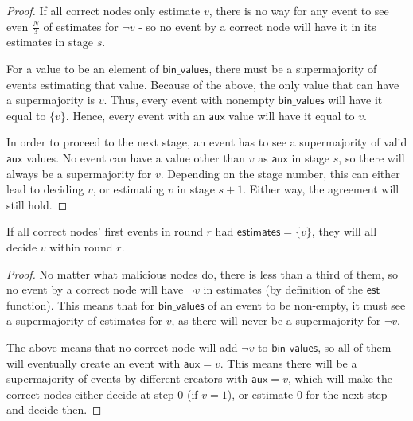 \documentclass[a4paper,fleqn]{article}
\begin{document}
\begin{proof}
	If all correct nodes only estimate $v$, there is no way for any event to see even $\frac{N}{3}$
	of estimates for $\neg v$ - so no event by a correct node will have it in its estimates in
	stage $s$.

	For a value to be an element of $\mathsf{bin\_values}$, there must be a supermajority of events
	estimating that value. Because of the above, the only value that can have a supermajority is
	$v$. Thus, every event with nonempty $\mathsf{bin\_values}$ will have it equal to $\{v\}$.
	Hence, every event with an $\mathsf{aux}$ value will have it equal to $v$.

	In order to proceed to the next stage, an event has to see a supermajority of valid
	$\mathsf{aux}$ values. No event can have a value other than $v$ as $\mathsf{aux}$ in stage $s$,
	so there will always be a supermajority for $v$. Depending on the stage number, this can either
	lead to deciding $v$, or estimating $v$ in stage $s+1$. Either way, the agreement will still
	hold.
\end{proof}

\begin{lem}\label{decide}
	If all correct nodes' first events in round $r$ had $\mathsf{estimates} = \{v\}$, they will all
	decide $v$ within round $r$.
\end{lem}

\begin{proof}
	No matter what malicious nodes do, there is less than a third of them, so no event by a correct
	node will have $\neg v$ in estimates (by definition of the $\mathsf{est}$ function). This means
	that for $\mathsf{bin\_values}$ of an event to be non-empty, it must see a supermajority of
	estimates for $v$, as there will never be a supermajority for $\neg v$.

	The above means that no correct node will add $\neg v$ to $\mathsf{bin\_values}$, so all of
	them will eventually create an event with $\mathsf{aux} = v$. This means there will be a
	supermajority of events by different creators with $\mathsf{aux} = v$, which will make the
	correct nodes either decide at step 0 (if $v = 1$), or estimate 0 for the next step and
	decide then.
\end{proof}
\end{document}
